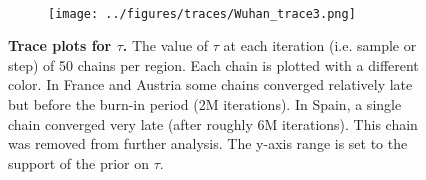 \documentclass[12pt]{extarticle}
\begin{document}
\begin{figure}[p]
    ~%
	\begin{subfigure}{0.32\textwidth}
        \texttt{[image: ../figures/traces/Wuhan\_trace3.png]}
    \end{subfigure}
    \caption{    %
    \textbf{Trace plots for $\tau$.}
    The value of $\tau$ at each iteration (i.e. sample or step) of 50 chains per region. Each chain is plotted with a different color. In France and Austria some chains converged relatively late but before the burn-in period (2M iterations). In Spain, a single chain converged very late (after roughly 6M iterations). This chain was removed from further analysis. The y-axis range is set to the support of the prior on $\tau$.
    }
    \label{fig:trace}	    
\end{figure}



\end{document}
